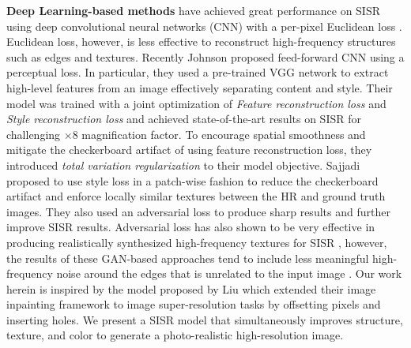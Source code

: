 \documentclass[10pt,twocolumn,letterpaper]{article}
\begin{document}
\textbf{Deep Learning-based methods} have achieved great performance on SISR using deep convolutional neural networks (CNN) with a per-pixel Euclidean loss \cite{shi2016real,dong2014learning,kim2016accurate}. 
Euclidean loss, however, is less effective to reconstruct high-frequency structures such as edges and textures. Recently Johnson \etal \cite{johnson2016perceptual} proposed feed-forward CNN using a perceptual loss. In particular, they used a pre-trained VGG network \cite{simonyan2014very} to extract high-level features from an image effectively separating content and style. Their model was trained with a joint optimization of \textit{Feature reconstruction loss} and \textit{Style reconstruction loss} and achieved state-of-the-art results on SISR for challenging $\times 8$ magnification factor. To encourage spatial smoothness and mitigate the checkerboard artifact \cite{odena2016deconvolution} of using feature reconstruction loss, they introduced \textit{total variation regularization} \cite{rudin1992nonlinear} to their model objective. Sajjadi \etal \cite{sajjadi2017enhancenet} proposed to use style loss in a patch-wise fashion to reduce the checkerboard artifact and enforce locally similar textures between the HR and ground truth images. They also used an adversarial loss to produce sharp results and further improve SISR results. Adversarial loss has also shown to be very effective in producing realistically synthesized high-frequency textures for SISR \cite{ledig2017photo,haris2018deep,park2018srfeat}, however, the results of these GAN-based approaches tend to include less meaningful high-frequency noise around the edges that is unrelated to the input image \cite{park2018srfeat}. Our work herein is inspired by the model proposed by Liu \etal \cite{Liu_2018_ECCV} which extended their image inpainting framework to image super-resolution tasks by offsetting pixels and inserting holes. We present a SISR model that simultaneously improves structure, texture, and color to generate a photo-realistic high-resolution image.
\end{document}
